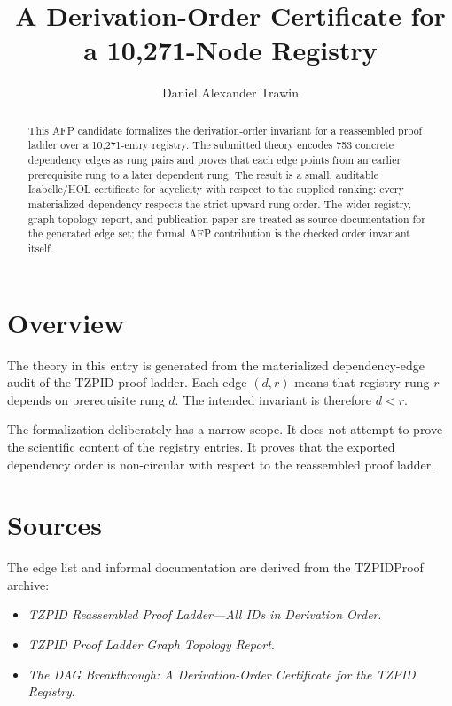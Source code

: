 \documentclass[11pt]{article}
\title{A Derivation-Order Certificate for a 10,271-Node Registry}
\author{Daniel Alexander Trawin}
\date{}
\begin{document}
\maketitle

\begin{abstract}
This AFP candidate formalizes the derivation-order invariant for a reassembled proof ladder over a 10,271-entry registry. The submitted theory encodes 753 concrete dependency edges as rung pairs and proves that each edge points from an earlier prerequisite rung to a later dependent rung. The result is a small, auditable Isabelle/HOL certificate for acyclicity with respect to the supplied ranking: every materialized dependency respects the strict upward-rung order. The wider registry, graph-topology report, and publication paper are treated as source documentation for the generated edge set; the formal AFP contribution is the checked order invariant itself.
\end{abstract}

\tableofcontents

\section{Overview}

The theory in this entry is generated from the materialized dependency-edge audit of the TZPID proof ladder. Each edge \((d,r)\) means that registry rung \(r\) depends on prerequisite rung \(d\). The intended invariant is therefore \(d < r\).

The formalization deliberately has a narrow scope. It does not attempt to prove the scientific content of the registry entries. It proves that the exported dependency order is non-circular with respect to the reassembled proof ladder.

\section{Sources}

The edge list and informal documentation are derived from the TZPIDProof archive:

\begin{itemize}
  \item \emph{TZPID Reassembled Proof Ladder---All IDs in Derivation Order}.
  \item \emph{TZPID Proof Ladder Graph Topology Report}.
  \item \emph{The DAG Breakthrough: A Derivation-Order Certificate for the TZPID Registry}.
\end{itemize}
\end{document}
